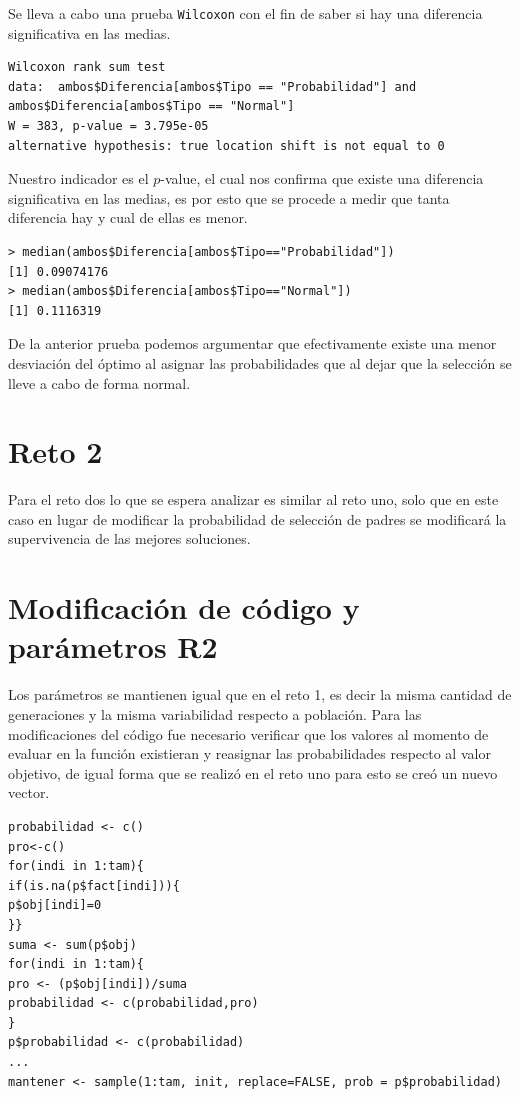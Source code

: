 \documentclass[a4paper]{article}
\begin{document}
Se lleva a cabo una prueba \texttt{Wilcoxon} con el fin de saber si hay una diferencia significativa en las medias.
\begin{lstlisting}[frame=single]
Wilcoxon rank sum test
data:  ambos$Diferencia[ambos$Tipo == "Probabilidad"] and 
ambos$Diferencia[ambos$Tipo == "Normal"]
W = 383, p-value = 3.795e-05
alternative hypothesis: true location shift is not equal to 0
\end{lstlisting}
Nuestro indicador es el  $p$-value, el cual nos confirma que existe una diferencia significativa en las medias, es por esto que se procede a medir que tanta diferencia hay y cual de ellas es menor.

\begin{lstlisting}[frame=single]
> median(ambos$Diferencia[ambos$Tipo=="Probabilidad"])
[1] 0.09074176
> median(ambos$Diferencia[ambos$Tipo=="Normal"])
[1] 0.1116319
\end{lstlisting}

De la anterior prueba podemos argumentar que efectivamente existe una menor desviación del óptimo al asignar las probabilidades que al dejar que la selección se lleve a cabo de forma normal.

\section{Reto 2}
Para el reto dos lo que se espera analizar es similar al reto uno, solo que en este caso en lugar de modificar la probabilidad de selección de padres se modificará la supervivencia de las mejores soluciones.

\section{Modificación de código y parámetros R2}
Los parámetros se mantienen igual que en el reto 1, es decir la misma cantidad de generaciones y la misma variabilidad respecto a población. Para las modificaciones del código fue necesario verificar que los valores al momento de evaluar en la función existieran y reasignar las probabilidades respecto al valor objetivo, de igual forma que se realizó en el reto uno para esto se creó un nuevo vector.

\begin{lstlisting}[frame=single]
probabilidad <- c()
pro<-c()
for(indi in 1:tam){
if(is.na(p$fact[indi])){
p$obj[indi]=0
}}
suma <- sum(p$obj)
for(indi in 1:tam){
pro <- (p$obj[indi])/suma
probabilidad <- c(probabilidad,pro)
}
p$probabilidad <- c(probabilidad)
...
mantener <- sample(1:tam, init, replace=FALSE, prob = p$probabilidad)
\end{lstlisting}
\end{document}

